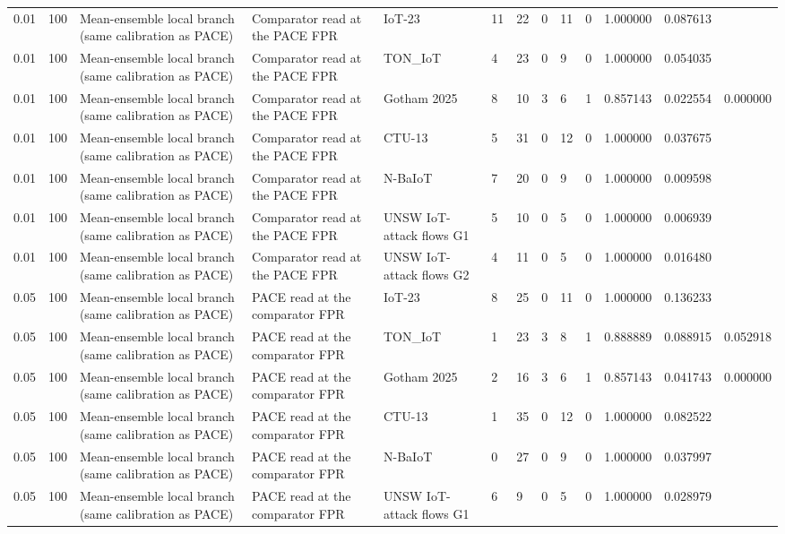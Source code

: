 \begin{tabular}{lllllllllllll}
0.01 & 100 & Mean-ensemble local branch (same calibration as PACE) & Comparator read at the PACE FPR & IoT-23 & 11 & 22 & 0 & 11 & 0 & 1.000000 & 0.087613 &  \\
0.01 & 100 & Mean-ensemble local branch (same calibration as PACE) & Comparator read at the PACE FPR & TON\_IoT & 4 & 23 & 0 & 9 & 0 & 1.000000 & 0.054035 &  \\
0.01 & 100 & Mean-ensemble local branch (same calibration as PACE) & Comparator read at the PACE FPR & Gotham 2025 & 8 & 10 & 3 & 6 & 1 & 0.857143 & 0.022554 & 0.000000 \\
0.01 & 100 & Mean-ensemble local branch (same calibration as PACE) & Comparator read at the PACE FPR & CTU-13 & 5 & 31 & 0 & 12 & 0 & 1.000000 & 0.037675 &  \\
0.01 & 100 & Mean-ensemble local branch (same calibration as PACE) & Comparator read at the PACE FPR & N-BaIoT & 7 & 20 & 0 & 9 & 0 & 1.000000 & 0.009598 &  \\
0.01 & 100 & Mean-ensemble local branch (same calibration as PACE) & Comparator read at the PACE FPR & UNSW IoT-attack flows G1 & 5 & 10 & 0 & 5 & 0 & 1.000000 & 0.006939 &  \\
0.01 & 100 & Mean-ensemble local branch (same calibration as PACE) & Comparator read at the PACE FPR & UNSW IoT-attack flows G2 & 4 & 11 & 0 & 5 & 0 & 1.000000 & 0.016480 &  \\
0.05 & 100 & Mean-ensemble local branch (same calibration as PACE) & PACE read at the comparator FPR & IoT-23 & 8 & 25 & 0 & 11 & 0 & 1.000000 & 0.136233 &  \\
0.05 & 100 & Mean-ensemble local branch (same calibration as PACE) & PACE read at the comparator FPR & TON\_IoT & 1 & 23 & 3 & 8 & 1 & 0.888889 & 0.088915 & 0.052918 \\
0.05 & 100 & Mean-ensemble local branch (same calibration as PACE) & PACE read at the comparator FPR & Gotham 2025 & 2 & 16 & 3 & 6 & 1 & 0.857143 & 0.041743 & 0.000000 \\
0.05 & 100 & Mean-ensemble local branch (same calibration as PACE) & PACE read at the comparator FPR & CTU-13 & 1 & 35 & 0 & 12 & 0 & 1.000000 & 0.082522 &  \\
0.05 & 100 & Mean-ensemble local branch (same calibration as PACE) & PACE read at the comparator FPR & N-BaIoT & 0 & 27 & 0 & 9 & 0 & 1.000000 & 0.037997 &  \\
0.05 & 100 & Mean-ensemble local branch (same calibration as PACE) & PACE read at the comparator FPR & UNSW IoT-attack flows G1 & 6 & 9 & 0 & 5 & 0 & 1.000000 & 0.028979 &  \\

\end{tabular}
